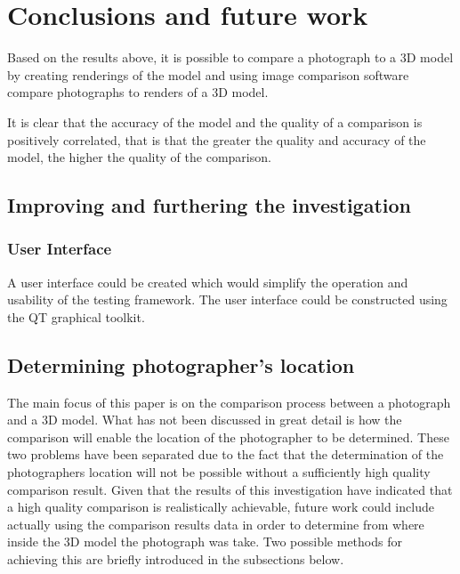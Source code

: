 \documentclass[11pt,a4paper]{report}
\begin{document}
\chapter{Conclusions and future work}
	Based on the results above, it is possible to compare a photograph to a 3D model by creating renderings of the model and using image comparison software compare photographs to renders of a 3D model.
	
	It is clear that the accuracy of the model and the quality of a comparison is positively correlated, that is that the greater the quality and accuracy of the model, the higher the quality of the comparison.
	
	\section{Improving and furthering the investigation}
		\subsection{User Interface}
			A user interface could be created which would simplify the operation and usability of the testing framework. The user interface could be constructed using the QT graphical toolkit.  
		
	\section{Determining photographer's location}
		The main focus of this paper is on the comparison process between a photograph and a 3D model. What has not been discussed in great detail is how the comparison will enable the location of the photographer to be determined. These two problems have been separated due to the fact that the determination of the photographers location will not be possible without a sufficiently high quality comparison result. Given that the results of this investigation have indicated that a high quality comparison is realistically achievable, future work could include actually using the comparison results data in order to determine from where inside the 3D model the photograph was take. Two possible methods for achieving this are briefly introduced in the subsections below.
\end{document}
